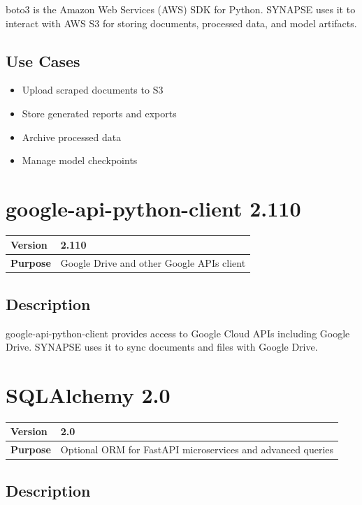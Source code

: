 \documentclass[12pt,a4paper]{report}
\begin{document}
boto3 is the Amazon Web Services (AWS) SDK for Python. SYNAPSE uses it to interact with AWS S3 for storing documents, processed data, and model artifacts.

\subsection{Use Cases}

\begin{itemize}
    \item Upload scraped documents to S3
    \item Store generated reports and exports
    \item Archive processed data
    \item Manage model checkpoints
\end{itemize}

\section{google-api-python-client 2.110}

\begin{tabular}{|p{4cm}|p{10cm}|}
\hline
\textbf{Version} & 2.110 \\
\hline
\textbf{Purpose} & Google Drive and other Google APIs client \\
\hline
\end{tabular}

\subsection{Description}

google-api-python-client provides access to Google Cloud APIs including Google Drive. SYNAPSE uses it to sync documents and files with Google Drive.

\section{SQLAlchemy 2.0}

\begin{tabular}{|p{4cm}|p{10cm}|}
\hline
\textbf{Version} & 2.0 \\
\hline
\textbf{Purpose} & Optional ORM for FastAPI microservices and advanced queries \\
\hline
\end{tabular}

\subsection{Description}
\end{document}
